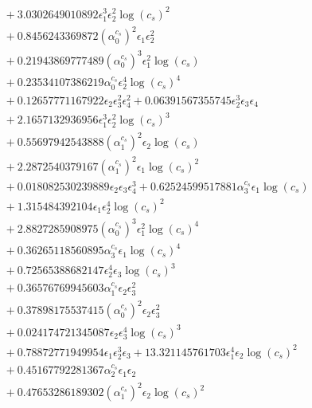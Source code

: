 \documentclass[10pt]{article}
\begin{document}
\begin{align*}
&{}  + 3.0302649010892 \epsilon_{1}^{3} \epsilon_{2}^{2} \log{\left(c_{s} \right)}^{2} \\
&{}  + 0.8456243369872 \left(\alpha_{0}^{c_s}\right)^{2} \epsilon_{1} \epsilon_{2}^{2} \\
&{}  + 0.21943869777489 \left(\alpha_{0}^{c_s}\right)^{3} \epsilon_{1}^{2} \log{\left(c_{s} \right)} \\
&{}  + 0.23534107386219 \alpha_{0}^{c_s} \epsilon_{2}^{4} \log{\left(c_{s} \right)}^{4} \\
&{}  + 0.12657771167922 \epsilon_{2} \epsilon_{3}^{2} \epsilon_{4}^{2} + 0.06391567355745 \epsilon_{2}^{3} \epsilon_{3} \epsilon_{4} \\
&{}  + 2.1657132936956 \epsilon_{1}^{3} \epsilon_{2}^{2} \log{\left(c_{s} \right)}^{3} \\
&{}  + 0.55697942543888 \left(\alpha_{1}^{c_s}\right)^{2} \epsilon_{2} \log{\left(c_{s} \right)} \\
&{}  + 2.2872540379167 \left(\alpha_{1}^{c_s}\right)^{2} \epsilon_{1} \log{\left(c_{s} \right)}^{2} \\
&{}  + 0.018082530239889 \epsilon_{2} \epsilon_{3} \epsilon_{4}^{3} + 0.62524599517881 \alpha_{3}^{c_s} \epsilon_{1} \log{\left(c_{s} \right)} \\
&{}  + 1.315484392104 \epsilon_{1} \epsilon_{2}^{4} \log{\left(c_{s} \right)}^{2} \\
&{}  + 2.8827285908975 \left(\alpha_{0}^{c_s}\right)^{3} \epsilon_{1}^{2} \log{\left(c_{s} \right)}^{4} \\
&{}  + 0.36265118560895 \alpha_{3}^{c_s} \epsilon_{1} \log{\left(c_{s} \right)}^{4} \\
&{}  + 0.72565388682147 \epsilon_{2}^{4} \epsilon_{3} \log{\left(c_{s} \right)}^{3} \\
&{}  + 0.36576769945603 \alpha_{1}^{c_s} \epsilon_{2} \epsilon_{3}^{2} \\
&{}  + 0.37898175537415 \left(\alpha_{0}^{c_s}\right)^{2} \epsilon_{2} \epsilon_{3}^{2} \\
&{}  + 0.024174721345087 \epsilon_{2} \epsilon_{3}^{4} \log{\left(c_{s} \right)}^{3} \\
&{}  + 0.78872771949954 \epsilon_{1} \epsilon_{2}^{3} \epsilon_{3} + 13.321145761703 \epsilon_{1}^{4} \epsilon_{2} \log{\left(c_{s} \right)}^{2} \\
&{}  + 0.45167792281367 \alpha_{2}^{c_s} \epsilon_{1} \epsilon_{2} \\
&{}  + 0.47653286189302 \left(\alpha_{1}^{c_s}\right)^{2} \epsilon_{2} \log{\left(c_{s} \right)}^{2} \\

\end{align*}
\end{document}
